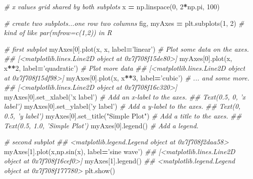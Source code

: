 \documentclass[12pt,krantz2]{krantz}
\makeatletter
\newenvironment{Shaded}{\begin{snugshade}}{\end{snugshade}}
\newcommand{\CommentTok}[1]{\textcolor[rgb]{0.37,0.37,0.37}{\textit{#1}}}
\newcommand{\DecValTok}[1]{\textcolor[rgb]{0.06,0.06,0.06}{#1}}
\newcommand{\NormalTok}[1]{#1}
\newcommand{\OperatorTok}[1]{\textcolor[rgb]{0.43,0.43,0.43}{\textbf{#1}}}
\newcommand{\StringTok}[1]{\textcolor[rgb]{0.5,0.5,0.5}{#1}}
\newenvironment{kframe}{%
\medskip{}
\setlength{\fboxsep}{.8em}
 \def\at@end@of@kframe{}%
 \ifinner\ifhmode%
  \def\at@end@of@kframe{\end{minipage}}%
  \begin{minipage}{\columnwidth}%
 \fi\fi%
 \def\FrameCommand##1{\hskip\@totalleftmargin \hskip-\fboxsep
 \colorbox{shadecolor}{##1}\hskip-\fboxsep
     \hskip-\linewidth \hskip-\@totalleftmargin \hskip\columnwidth}%
 \MakeFramed {\advance\hsize-\width
   \@totalleftmargin\z@ \linewidth\hsize
   \@setminipage}}%
 {\par\unskip\endMakeFramed%
 \at@end@of@kframe}
\renewenvironment{Shaded}{\begin{kframe}}{\end{kframe}}
\makeatother
\begin{document}
\begin{Shaded}
\begin{Highlighting}[]
\CommentTok{# x values grid shared by both subplots}
\NormalTok{x }\OperatorTok{=}\NormalTok{ np.linspace(}\DecValTok{0}\NormalTok{, }\DecValTok{2}\OperatorTok{*}\NormalTok{np.pi, }\DecValTok{100}\NormalTok{) }

\CommentTok{# create two subplots...one row two columns}
\NormalTok{fig, myAxes }\OperatorTok{=}\NormalTok{ plt.subplots(}\DecValTok{1}\NormalTok{, }\DecValTok{2}\NormalTok{) }\CommentTok{# kind of like par(mfrow=c(1,2)) in R}

\CommentTok{# first subplot}
\NormalTok{myAxes[}\DecValTok{0}\NormalTok{].plot(x, x, label}\OperatorTok{=}\StringTok{'linear'}\NormalTok{)  }\CommentTok{# Plot some data on the axes.}
\CommentTok{## [<matplotlib.lines.Line2D object at 0x7f708f15de80>]}
\NormalTok{myAxes[}\DecValTok{0}\NormalTok{].plot(x, x}\OperatorTok{**}\DecValTok{2}\NormalTok{, label}\OperatorTok{=}\StringTok{'quadratic'}\NormalTok{)  }\CommentTok{# Plot more data }
\CommentTok{## [<matplotlib.lines.Line2D object at 0x7f708f15df98>]}
\NormalTok{myAxes[}\DecValTok{0}\NormalTok{].plot(x, x}\OperatorTok{**}\DecValTok{3}\NormalTok{, label}\OperatorTok{=}\StringTok{'cubic'}\NormalTok{)  }\CommentTok{# ... and some more.}
\CommentTok{## [<matplotlib.lines.Line2D object at 0x7f708f16c320>]}
\NormalTok{myAxes[}\DecValTok{0}\NormalTok{].set_xlabel(}\StringTok{'x label'}\NormalTok{)  }\CommentTok{# Add an x-label to the axes.}
\CommentTok{## Text(0.5, 0, 'x label')}
\NormalTok{myAxes[}\DecValTok{0}\NormalTok{].set_ylabel(}\StringTok{'y label'}\NormalTok{)  }\CommentTok{# Add a y-label to the axes.}
\CommentTok{## Text(0, 0.5, 'y label')}
\NormalTok{myAxes[}\DecValTok{0}\NormalTok{].set_title(}\StringTok{"Simple Plot"}\NormalTok{)  }\CommentTok{# Add a title to the axes.}
\CommentTok{## Text(0.5, 1.0, 'Simple Plot')}
\NormalTok{myAxes[}\DecValTok{0}\NormalTok{].legend()  }\CommentTok{# Add a legend.}

\CommentTok{# second subplot}
\CommentTok{## <matplotlib.legend.Legend object at 0x7f708f2daa58>}
\NormalTok{myAxes[}\DecValTok{1}\NormalTok{].plot(x,np.sin(x), label}\OperatorTok{=}\StringTok{'sine wave'}\NormalTok{)}
\CommentTok{## [<matplotlib.lines.Line2D object at 0x7f708f16cef0>]}
\NormalTok{myAxes[}\DecValTok{1}\NormalTok{].legend()}
\CommentTok{## <matplotlib.legend.Legend object at 0x7f708f177780>}
\NormalTok{plt.show()}
\end{Highlighting}
\end{Shaded}
\end{document}
